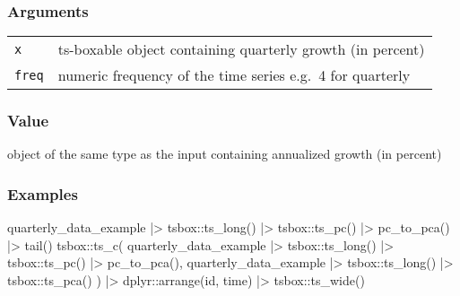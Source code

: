 \documentclass[
  letterpaper,
  DIV=11,
  numbers=noendperiod]{scrreport}
\newenvironment{Shaded}{\begin{snugshade}}{\end{snugshade}}
\newcommand{\FunctionTok}[1]{\textcolor[rgb]{0.28,0.35,0.67}{#1}}
\newcommand{\NormalTok}[1]{\textcolor[rgb]{0.00,0.23,0.31}{#1}}
\newcommand{\SpecialCharTok}[1]{\textcolor[rgb]{0.37,0.37,0.37}{#1}}
\begin{document}
\subsubsection{Arguments}\label{arguments-46}

\begin{longtable}[]{@{}ll@{}}
\toprule\noalign{}
\endhead
\bottomrule\noalign{}
\endlastfoot
\texttt{x} & ts-boxable object containing quarterly growth (in
percent) \\
\texttt{freq} & numeric frequency of the time series e.g.~4 for
quarterly \\
\end{longtable}

\subsubsection{Value}\label{value-46}

object of the same type as the input containing annualized growth (in
percent)

\subsubsection{Examples}\label{examples-46}

\begin{Shaded}
\begin{Highlighting}[]
\NormalTok{quarterly\_data\_example }\SpecialCharTok{|\textgreater{}}
\NormalTok{  tsbox}\SpecialCharTok{::}\FunctionTok{ts\_long}\NormalTok{() }\SpecialCharTok{|\textgreater{}}
\NormalTok{  tsbox}\SpecialCharTok{::}\FunctionTok{ts\_pc}\NormalTok{() }\SpecialCharTok{|\textgreater{}}
  \FunctionTok{pc\_to\_pca}\NormalTok{() }\SpecialCharTok{|\textgreater{}}
  \FunctionTok{tail}\NormalTok{()}
\NormalTok{tsbox}\SpecialCharTok{::}\FunctionTok{ts\_c}\NormalTok{(}
\NormalTok{  quarterly\_data\_example }\SpecialCharTok{|\textgreater{}}
\NormalTok{    tsbox}\SpecialCharTok{::}\FunctionTok{ts\_long}\NormalTok{() }\SpecialCharTok{|\textgreater{}}
\NormalTok{    tsbox}\SpecialCharTok{::}\FunctionTok{ts\_pc}\NormalTok{() }\SpecialCharTok{|\textgreater{}}
    \FunctionTok{pc\_to\_pca}\NormalTok{(),}
\NormalTok{  quarterly\_data\_example }\SpecialCharTok{|\textgreater{}}
\NormalTok{    tsbox}\SpecialCharTok{::}\FunctionTok{ts\_long}\NormalTok{() }\SpecialCharTok{|\textgreater{}}
\NormalTok{    tsbox}\SpecialCharTok{::}\FunctionTok{ts\_pca}\NormalTok{()}
\NormalTok{) }\SpecialCharTok{|\textgreater{}}
\NormalTok{  dplyr}\SpecialCharTok{::}\FunctionTok{arrange}\NormalTok{(id, time) }\SpecialCharTok{|\textgreater{}}
\NormalTok{  tsbox}\SpecialCharTok{::}\FunctionTok{ts\_wide}\NormalTok{()}
\end{Highlighting}
\end{Shaded}
\end{document}
